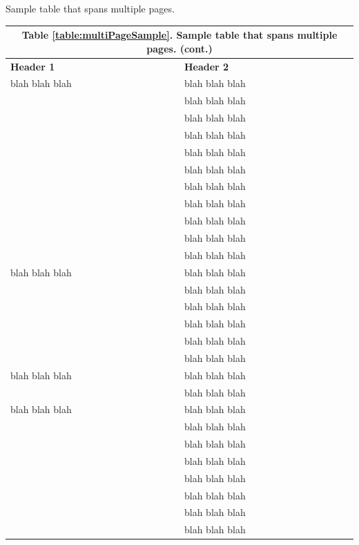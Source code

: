 \documentclass[a4paper,oneside,12pt]{report}
\numberwithin{equation}{chapter}
\begin{document}
\begingroup
\begin{table}[thbp]
	\caption[Sample table that spans multiple pages.]{Sample table that spans multiple pages.}
	\label{table:multiPageSample}
\end{table}
\begin{center}
	\addtocounter{table}{-1}
	\begin{longtable}{|l|l|}\hline
		\endfirsthead
		\multicolumn{2}{c}{Table \ref{table:multiPageSample}. Sample table that spans multiple pages. (cont.) \vspace{1em}} \\\hline
		\endhead
		\endfoot
		\endlastfoot
		
		\textbf{Header 1}& \textbf{Header 2}\\\hline
		blah blah blah & blah blah blah \\
		& blah blah blah \\
		& blah blah blah \\
		& blah blah blah \\
		& blah blah blah \\
		& blah blah blah \\
		& blah blah blah \\
		& blah blah blah \\
		& blah blah blah \\
		& blah blah blah \\
		& blah blah blah \\\hline
		
		blah blah blah & blah blah blah \\
		& blah blah blah \\
		& blah blah blah \\
		& blah blah blah \\
		& blah blah blah \\
		& blah blah blah \\\hline
		
		blah blah blah & blah blah blah \\
		& blah blah blah \\\hline
		blah blah blah & blah blah blah \\
		& blah blah blah \\
		& blah blah blah \\
		& blah blah blah \\
		& blah blah blah \\
		& blah blah blah \\
		& blah blah blah \\
		& blah blah blah \\\hline
		

\end{longtable}
\end{center}
\end{document}
